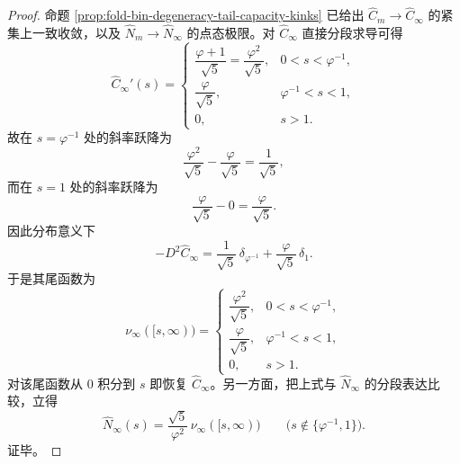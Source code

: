 \begin{proof}
命题 \ref{prop:fold-bin-degeneracy-tail-capacity-kinks} 已给出 \(\widehat C_m\to \widehat C_\infty\) 的紧集上一致收敛，以及 \(\widehat N_m\to \widehat N_\infty\) 的点态极限。对 \(\widehat C_\infty\) 直接分段求导可得
\[
\widehat C_\infty'(s)=
\begin{cases}
\dfrac{\varphi+1}{\sqrt5}=\dfrac{\varphi^2}{\sqrt5},& 0<s<\varphi^{-1},\\[3mm]
\dfrac{\varphi}{\sqrt5},& \varphi^{-1}<s<1,\\[3mm]
0,& s>1.
\end{cases}
\]
故在 \(s=\varphi^{-1}\) 处的斜率跃降为
\[
\frac{\varphi^2}{\sqrt5}-\frac{\varphi}{\sqrt5}=\frac{1}{\sqrt5},
\]
而在 \(s=1\) 处的斜率跃降为
\[
\frac{\varphi}{\sqrt5}-0=\frac{\varphi}{\sqrt5}.
\]
因此分布意义下
\[
-D^2\widehat C_\infty=\frac{1}{\sqrt5}\,\delta_{\varphi^{-1}}+\frac{\varphi}{\sqrt5}\,\delta_1.
\]
于是其尾函数为
\[
\nu_\infty([s,\infty))=
\begin{cases}
\dfrac{\varphi^2}{\sqrt5},& 0<s<\varphi^{-1},\\[3mm]
\dfrac{\varphi}{\sqrt5},& \varphi^{-1}<s<1,\\[3mm]
0,& s>1.
\end{cases}
\]
对该尾函数从 \(0\) 积分到 \(s\) 即恢复 \(\widehat C_\infty\)。另一方面，把上式与 \(\widehat N_\infty\) 的分段表达比较，立得
\[
\widehat N_\infty(s)=\frac{\sqrt5}{\varphi^2}\,\nu_\infty([s,\infty))
\qquad
\bigl(s\notin\{\varphi^{-1},1\}\bigr).
\]
证毕。
\end{proof}

